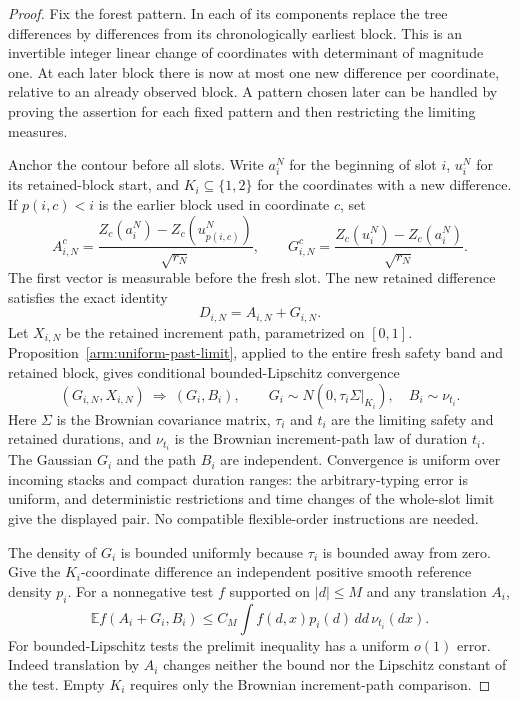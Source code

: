 \begin{proof}
Fix the forest pattern.  In each of its components replace the tree
differences by differences from its chronologically earliest block.
This is an invertible integer linear change of coordinates with
determinant of magnitude one.  At each later block there is now at most
one new difference per coordinate, relative to an already observed
block.  A pattern chosen later can be handled by proving the assertion
for each fixed pattern and then restricting the limiting measures.

Anchor the contour before all slots.  Write $a_i^N$ for the beginning
of slot $i$, $u_i^N$ for its retained-block start, and $K_i\subseteq
\{1,2\}$ for the coordinates with a new difference.  If $p(i,c)<i$ is
the earlier block used in coordinate $c$, set
\[
 A_{i,N}^c=
 \frac{Z_c(a_i^N)-Z_c(u_{p(i,c)}^N)}{\sqrt{r_N}},
 \qquad
 G_{i,N}^c=
 \frac{Z_c(u_i^N)-Z_c(a_i^N)}{\sqrt{r_N}} .
\]
The first vector is measurable before the fresh slot.  The new
retained difference satisfies the exact identity
\[
 D_{i,N}=A_{i,N}+G_{i,N}.
\]
Let $X_{i,N}$ be the retained increment path, parametrized on $[0,1]$.
Proposition~\ref{arm:uniform-past-limit}, applied to the entire fresh
safety band and retained block, gives conditional bounded-Lipschitz
convergence
\[
 (G_{i,N},X_{i,N})\ \Longrightarrow\ (G_i,B_i),
 \qquad
 G_i\sim N(0,\tau_i\Sigma|_{K_i}),\quad B_i\sim\nu_{t_i}.
\]
Here $\Sigma$ is the Brownian covariance matrix, $\tau_i$ and $t_i$
are the limiting safety and retained durations, and $\nu_{t_i}$ is
the Brownian increment-path law of duration $t_i$.
The Gaussian $G_i$ and the path $B_i$ are independent.  Convergence is
uniform over incoming stacks and compact duration ranges: the
arbitrary-typing error is uniform, and deterministic restrictions and
time changes of the whole-slot limit give the displayed pair.  No
compatible flexible-order instructions are needed.

The density of $G_i$ is bounded uniformly because $\tau_i$ is bounded
away from zero.  Give the $K_i$-coordinate difference an independent
positive smooth reference density $p_i$.  For a nonnegative test $f$
supported on $|d|\le M$ and any translation $A_i$,
\[
 \mathbb E f(A_i+G_i,B_i)
 \le C_M\int f(d,x)p_i(d)\,dd\,\nu_{t_i}(dx).
\]
For bounded-Lipschitz tests the prelimit inequality has a uniform
$o(1)$ error.  Indeed translation by $A_i$ changes neither the bound
nor the Lipschitz constant of the test.  Empty $K_i$ requires only
the Brownian increment-path comparison.


\end{proof}

